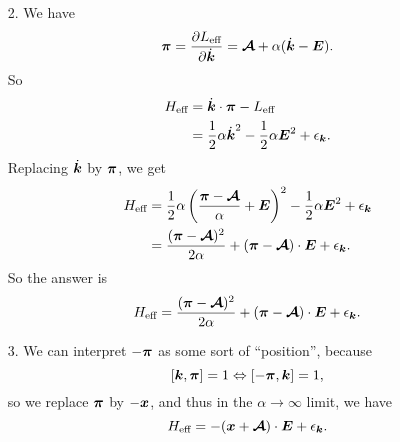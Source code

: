 \documentclass[hyperref, a4paper]{article}
\begin{document}
\begin{itemize}
\item[2.] We have 
\begin{equation}
    \vb*{\pi} = \pdv{L_{\text{eff}}}{\dot{\vb*{k}}} = \vb*{\mathcal{A}} + \alpha (\dot{\vb*{k}} - \vb*{E}).
\end{equation}
So 
\[
    \begin{aligned}
        H_{\text{eff}} &= \dot{\vb*{k}} \cdot \vb*{\pi} - L_{\text{eff}} \\
        &= \frac{1}{2} \alpha \dot{\vb*{k}}^2 - \frac{1}{2} \alpha \vb*{E}^2 + \epsilon_{\vb*{k}}.
    \end{aligned}
\]
Replacing $\dot{\vb*{k}}$ by $\vb*{\pi}$, 
we get 
\[
    \begin{aligned}
        H_{\text{eff}} &= \frac{1}{2} \alpha \left( \frac{\vb*{\pi} - \vb*{\mathcal{A}}}{\alpha} + \vb*{E} \right)^2
        - \frac{1}{2} \alpha \vb*{E}^2 + \epsilon_{\vb*{k}} \\
        &= \frac{(\vb*{\pi} - \vb*{\mathcal{A}})^2}{2 \alpha} + (\vb*{\pi} - \vb*{\mathcal{A}}) \cdot \vb*{E} + \epsilon_{\vb*{k}}.
    \end{aligned}
\]
So the answer is 
\begin{equation}
    H_{\text{eff}} = \frac{(\vb*{\pi} - \vb*{\mathcal{A}})^2}{2 \alpha} + (\vb*{\pi} - \vb*{\mathcal{A}}) \cdot \vb*{E} + \epsilon_{\vb*{k}}.
\end{equation}

\item[3.] We can interpret $-\vb*{\pi}$ as some sort of ``position'',
because 
\[
    \comm{\vb*{k}}{\vb*{\pi}} = 1 \Leftrightarrow \comm{- \vb*{\pi}}{\vb*{k}} = 1,
\]
so we replace $\vb*{\pi}$ by $- \vb*{x}$, and thus in the $\alpha \to \infty$ limit, we have
\begin{equation}
    H_{\text{eff}} = - (\vb*{x} + \vb*{\mathcal{A}}) \cdot \vb*{E} + \epsilon_{\vb*{k}}.
\end{equation}


\end{itemize}
\end{document}

